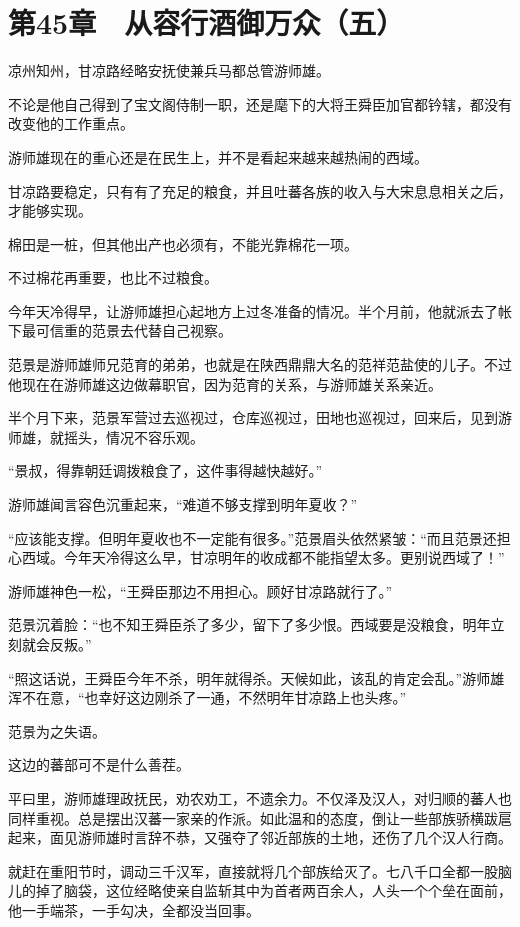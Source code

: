 \section{第45章　从容行酒御万众（五）}

凉州知州，甘凉路经略安抚使兼兵马都总管游师雄。

不论是他自己得到了宝文阁侍制一职，还是麾下的大将王舜臣加官都钤辖，都没有改变他的工作重点。

游师雄现在的重心还是在民生上，并不是看起来越来越热闹的西域。

甘凉路要稳定，只有有了充足的粮食，并且吐蕃各族的收入与大宋息息相关之后，才能够实现。

棉田是一桩，但其他出产也必须有，不能光靠棉花一项。

不过棉花再重要，也比不过粮食。

今年天冷得早，让游师雄担心起地方上过冬准备的情况。半个月前，他就派去了帐下最可信重的范景去代替自己视察。

范景是游师雄师兄范育的弟弟，也就是在陕西鼎鼎大名的范祥范盐使的儿子。不过他现在在游师雄这边做幕职官，因为范育的关系，与游师雄关系亲近。

半个月下来，范景军营过去巡视过，仓库巡视过，田地也巡视过，回来后，见到游师雄，就摇头，情况不容乐观。

“景叔，得靠朝廷调拨粮食了，这件事得越快越好。”

游师雄闻言容色沉重起来，“难道不够支撑到明年夏收？”

“应该能支撑。但明年夏收也不一定能有很多。”范景眉头依然紧皱：“而且范景还担心西域。今年天冷得这么早，甘凉明年的收成都不能指望太多。更别说西域了！”

游师雄神色一松，“王舜臣那边不用担心。顾好甘凉路就行了。”

范景沉着脸：“也不知王舜臣杀了多少，留下了多少恨。西域要是没粮食，明年立刻就会反叛。”

“照这话说，王舜臣今年不杀，明年就得杀。天候如此，该乱的肯定会乱。”游师雄浑不在意，“也幸好这边刚杀了一通，不然明年甘凉路上也头疼。”

范景为之失语。

这边的蕃部可不是什么善茬。

平曰里，游师雄理政抚民，劝农劝工，不遗余力。不仅泽及汉人，对归顺的蕃人也同样重视。总是摆出汉蕃一家亲的作派。如此温和的态度，倒让一些部族骄横跋扈起来，面见游师雄时言辞不恭，又强夺了邻近部族的土地，还伤了几个汉人行商。

就赶在重阳节时，调动三千汉军，直接就将几个部族给灭了。七八千口全都一股脑儿的掉了脑袋，这位经略使亲自监斩其中为首者两百余人，人头一个个垒在面前，他一手端茶，一手勾决，全都没当回事。


